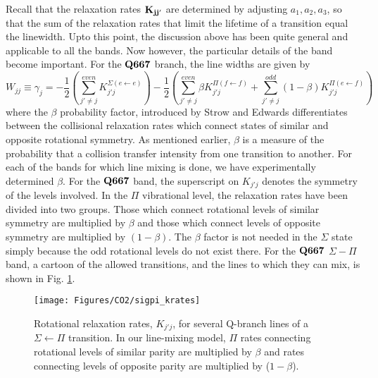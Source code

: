 \documentclass[11pt]{article}
\begin{document}
Recall that the relaxation rates ${\bf K_{jj'}}$ are determined
by adjusting $a_{1},a_{2},a_{3}$, so that the sum of the relaxation rates
that limit the lifetime of a transition equal the linewidth. 
Upto this point, the discussion above has been quite general and applicable
to all the bands. Now however, the particular details of the band become 
important. For the $\bf{Q 667}$ branch, the line widths are given by
\[
   W_{jj}\equiv\gamma_{j}=-\frac{1}{2}\left(
   \sum_{j'\neq j}^{even}K_{j'j}^{\Sigma(e\leftarrow e)}\right)-
   \frac{1}{2}\left(
   \sum_{j'\neq j}^{even}\beta K_{j'j}^{\Pi(f\leftarrow f)}+
   \sum_{j'\neq j}^{odd}(1-\beta)K_{j'j}^{\Pi(e\leftarrow f)}\right)
\]
where the $\beta$ probability factor, introduced by Strow and
Edwards \cite{edw:91} differentiates between the collisional relaxation
rates which connect states of similar and opposite rotational
symmetry. As mentioned earlier, $\beta$ is a measure of the probability that
a collision transfer intensity from one transition to another. For each of 
the bands for which line mixing is done, we have experimentally 
determined $\beta$. 
For the ${\bf Q 667}$ band, the superscript on $K_{j'j}$ denotes the 
symmetry of the levels involved.  In the $\Pi$ vibrational level, the 
relaxation rates have
been divided into two groups.  Those which connect rotational levels of
similar symmetry are multiplied by $\beta$ and those which connect levels
of opposite symmetry are multiplied by $(1-\beta)$.  The $\beta$ factor is
not needed in the $\Sigma$ state simply because the odd rotational levels
do not exist there. For the ${\bf Q 667}$ $\Sigma-\Pi$ band, a cartoon of 
the allowed transitions, and the lines
to which they can mix, is shown in Fig. \ref{fig:sigpi_krates}.

\begin{figure}
\begin{center}
\texttt{[image: Figures/CO2/sigpi\_krates]}
\end{center}
  \caption[Rotational relaxation rates, $K_{j'j}$, for several Q-branch
        lines of a $\Sigma\leftarrow\Pi$ transition.]
        {Rotational relaxation rates, $K_{j'j}$, for several Q-branch
        lines of a $\Sigma\leftarrow\Pi$ transition.  In our line-mixing
        model, $\Pi$ rates connecting rotational levels of similar parity
        are multiplied by $\beta$ and rates connecting levels of opposite 
        parity are multiplied by ($1-\beta$).} 
  \label{fig:sigpi_krates}
\end{figure}
\end{document}
